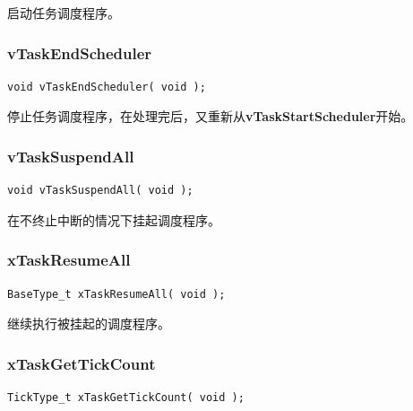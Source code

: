 \documentclass[12pt, a4paper]{article}
\begin{document}
启动任务调度程序。

\subsubsection {vTaskEndScheduler}

\begin{lstlisting}[language={[ANSI]C},keywordstyle=\color{blue!70},commentstyle=\color{red!50!green!50!blue!50},frame=shadowbox, rulesepcolor=\color{red!20!green!20!blue!20}]
void vTaskEndScheduler( void );
\end{lstlisting}

停止任务调度程序，在处理完后，又重新从\textbf{vTaskStartScheduler}开始。

\subsubsection {vTaskSuspendAll}

\begin{lstlisting}[language={[ANSI]C},keywordstyle=\color{blue!70},commentstyle=\color{red!50!green!50!blue!50},frame=shadowbox, rulesepcolor=\color{red!20!green!20!blue!20}]
void vTaskSuspendAll( void );
\end{lstlisting}

在不终止中断的情况下挂起调度程序。

\subsubsection {xTaskResumeAll}

\begin{lstlisting}[language={[ANSI]C},keywordstyle=\color{blue!70},commentstyle=\color{red!50!green!50!blue!50},frame=shadowbox, rulesepcolor=\color{red!20!green!20!blue!20}]
BaseType_t xTaskResumeAll( void );
\end{lstlisting}

继续执行被挂起的调度程序。

\subsubsection {xTaskGetTickCount}

\begin{lstlisting}[language={[ANSI]C},keywordstyle=\color{blue!70},commentstyle=\color{red!50!green!50!blue!50},frame=shadowbox, rulesepcolor=\color{red!20!green!20!blue!20}]
TickType_t xTaskGetTickCount( void );
\end{lstlisting}
\end{document}
